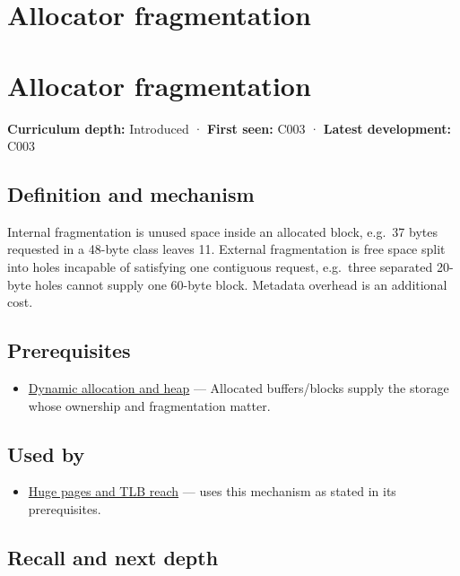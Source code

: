 \hypertarget{appendix-a7c50686d81f}{}
\section*{Allocator fragmentation}
\section{Allocator fragmentation}\label{allocator-fragmentation}

\textbf{Curriculum depth:} Introduced · \textbf{First seen:} C003 · \textbf{Latest development:} C003

\subsection{Definition and mechanism}\label{definition-and-mechanism}

Internal fragmentation is unused space inside an allocated block, e.g.~37 bytes requested in a 48-byte class leaves 11. External fragmentation is free space split into holes incapable of satisfying one contiguous request, e.g.~three separated 20-byte holes cannot supply one 60-byte block. Metadata overhead is an additional cost.

\subsection{Prerequisites}\label{prerequisites}

\begin{itemize}
\tightlist
\item
  \hyperref[appendix-c3480f7d9ff3]{Dynamic allocation and heap} --- Allocated buffers/blocks supply the storage whose ownership and fragmentation matter.
\end{itemize}

\subsection{Used by}\label{used-by}

\begin{itemize}
\tightlist
\item
  \hyperref[appendix-ce688d1acdab]{Huge pages and TLB reach} --- uses this mechanism as stated in its prerequisites.
\end{itemize}

\subsection{Recall and next depth}\label{recall-and-next-depth}

